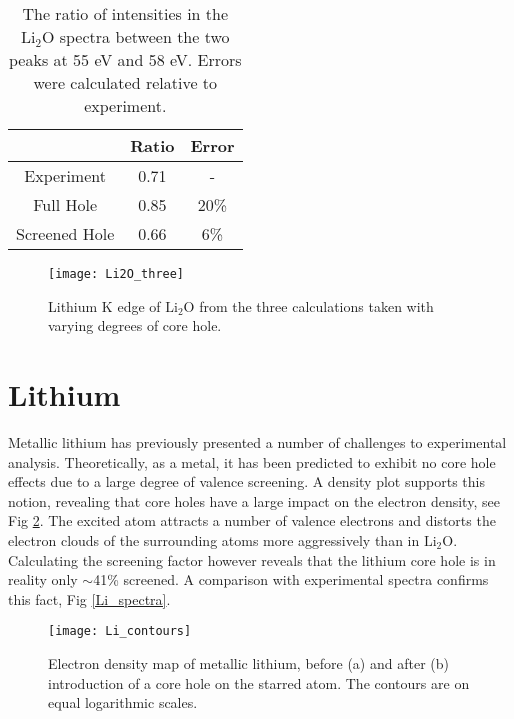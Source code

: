 \begin{table}
	\centering
	\begin{tabular}{ccc}
		& Ratio & Error \\
		\hline
		Experiment & 0.71 & -  \\
		Full Hole & 0.85 & 20\%  \\
		Screened Hole & 0.66 & 6\%  \\
		
	\end{tabular}
	\caption{The ratio of intensities in the $\mathrm{Li_2O}$ spectra between the two peaks at 55 eV and 58 eV.  Errors were calculated relative to experiment.   }
	\label{ratio}
\end{table}




\begin{figure}
	\centering
	\texttt{[image: Li2O\_three]}
	\caption{Lithium K edge of $ \mathrm{Li_2O} $ from the three calculations taken with varying degrees of core hole. }
	\label{Li2O_three}
\end{figure}

\section{Lithium}
Metallic lithium has previously presented a  number of challenges to experimental analysis. Theoretically, as a metal, it has been predicted to exhibit no core hole effects due to a large degree of valence screening. A density plot supports this notion, revealing that core  holes have a large impact on the electron density, see Fig \ref{Li_countours}.  The excited atom attracts a number of valence electrons and  distorts the electron clouds of the surrounding atoms more aggressively than in $ \mathrm{Li_2O} $.  Calculating the screening factor however reveals that the lithium core hole is in reality only $ \sim$41\% screened.  A comparison with experimental spectra confirms this fact, Fig \ref{Li_spectra}.


\begin{figure}
	\centering
	\texttt{[image: Li\_contours]}
	\caption{Electron density map of metallic lithium, before (a) and after (b) introduction of a core hole on the starred atom.  The contours are on equal logarithmic scales.}
	\label{Li_countours}
\end{figure}




